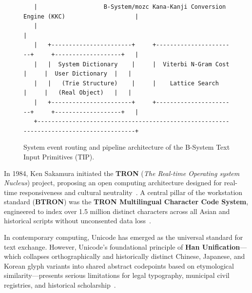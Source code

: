 \documentclass[10pt,journal,compsoc,twocolumn]{article}
\begin{document}
\begin{figure}[htbp]
\begin{lstlisting}
   |                   B-System/mozc Kana-Kanji Conversion Engine (KKC)                    |
   |                                                                                       |
   |   +-----------------------+     +-----------------------+     +-------------------+   |
   |   |  System Dictionary    |     |  Viterbi N-Gram Cost  |     |  User Dictionary  |   |
   |   |   (Trie Structure)    |     |    Lattice Search     |     |   (Real Object)   |   |
   |   +-----------------------+     +-----------------------+     +-------------------+   |
   +---------------------------------------------------------------------------------------+
\end{lstlisting}
\caption{System event routing and pipeline architecture of the B-System Text Input Primitives (TIP).}
\label{fig:tip_arch}
\end{figure}

In 1984, Ken Sakamura initiated the \textbf{TRON} (\emph{The Real-time Operating system Nucleus}) project, proposing an open computing architecture designed for real-time responsiveness and cultural neutrality~\cite{sakamura1984tron}. A central pillar of the workstation standard (\textbf{BTRON}) was the \textbf{TRON Multilingual Character Code System}, engineered to index over 1.5 million distinct characters across all Asian and historical scripts without unconsented data loss~\cite{troncharset}.

In contemporary computing, Unicode has emerged as the universal standard for text exchange. However, Unicode's foundational principle of \textbf{Han Unification}---which collapses orthographically and historically distinct Chinese, Japanese, and Korean glyph variants into shared abstract codepoints based on etymological similarity---presents serious limitations for legal typography, municipal civil registries, and historical scholarship~\cite{lunde2008cjk}.
\end{document}
